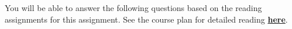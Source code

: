 
You will be able to answer the following questions based on the reading assignments for this assignment. See the course plan for detailed reading  \href{https://docs.google.com/spreadsheets/d/1HC_QN2mCq9bkCPzmkP8RaR3RokFQCWo9oPuU7rFyR8Y/edit?usp=sharing}{\textbf{here}}.
